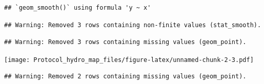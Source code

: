 \documentclass[]{article}
\newenvironment{Shaded}{\begin{snugshade}}{\end{snugshade}}
\newcommand{\KeywordTok}[1]{\textcolor[rgb]{0.13,0.29,0.53}{\textbf{#1}}}
\newcommand{\DataTypeTok}[1]{\textcolor[rgb]{0.13,0.29,0.53}{#1}}
\newcommand{\StringTok}[1]{\textcolor[rgb]{0.31,0.60,0.02}{#1}}
\newcommand{\OperatorTok}[1]{\textcolor[rgb]{0.81,0.36,0.00}{\textbf{#1}}}
\newcommand{\NormalTok}[1]{#1}
\begin{document}
\begin{verbatim}
## `geom_smooth()` using formula 'y ~ x'
\end{verbatim}

\begin{verbatim}
## Warning: Removed 3 rows containing non-finite values (stat_smooth).
\end{verbatim}

\begin{verbatim}
## Warning: Removed 3 rows containing missing values (geom_point).
\end{verbatim}

\texttt{[image: Protocol\_hydro\_map\_files/figure-latex/unnamed-chunk-2-3.pdf]}

\begin{Shaded}
\end{Shaded}

\begin{verbatim}
## Warning: Removed 2 rows containing missing values (geom_point).
\end{verbatim}
\end{document}
